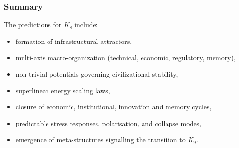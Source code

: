 \subsubsection{Summary}

The predictions for $K_8$ include:
\begin{itemize}
    \item formation of infrastructural attractors,
    \item multi-axis macro-organization (technical, economic, regulatory, memory),
    \item non-trivial potentials governing civilizational stability,
    \item superlinear energy scaling laws,
    \item closure of economic, institutional, innovation and memory cycles,
    \item predictable stress responses, polarisation, and collapse modes,
    \item emergence of meta-structures signalling the transition to $K_9$.
\end{itemize}
